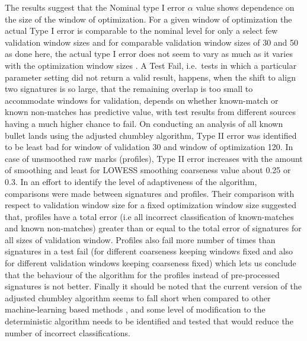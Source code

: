 \documentclass[12pt]{article}
\begin{document}
The results suggest that the Nominal type I error \(\alpha\) value shows
dependence on the size of the window of optimization. For a given window
of optimization the actual Type I error is comparable to the nominal
level for only a select few validation window sizes and for comparable
validation window sizes of 30 and 50 as done here, the actual type I
error does not seem to vary as much as it varies with the optimization
window sizes . A Test Fail, i.e.~tests in which a particular parameter
setting did not return a valid result, happens, when the shift to align
two signatures is so large, that the remaining overlap is too small to
accommodate windows for validation, depends on whether known-match or
known non-matches has predictive value, with test results from different
sources having a much higher chance to fail. On conducting an analysis
of all known bullet lands using the adjusted chumbley algorithm, Type II
error was identified to be least bad for window of validation 30 and
window of optimization 120. In case of unsmoothed raw marks (profiles),
Type II error increases with the amount of smoothing and least for
LOWESS smoothing coarseness value about 0.25 or 0.3. In an effort to
identify the level of adaptiveness of the algorithm, comparisons were
made between signatures and profiles. Their comparison with respect to
validation window size for a fixed optimization window size suggested
that, profiles have a total error (i.e all incorrect classification of
known-matches and known non-matches) greater than or equal to the total
error of signatures for all sizes of validation window. Profiles also
fail more number of times than signatures in a test fail (for different
coarseness keeping windows fixed and also for different validation
windows keeping coarseness fixed) which lets us conclude that the
behaviour of the algorithm for the profiles instead of pre-processed
signatures is not better. Finally it should be noted that the current
version of the adjusted chumbley algorithm seems to fall short when
compared to other machine-learning based methods \citet{aoas}, and some
level of modification to the deterministic algorithm needs to be
identified and tested that would reduce the number of incorrect
classifications.
\end{document}
